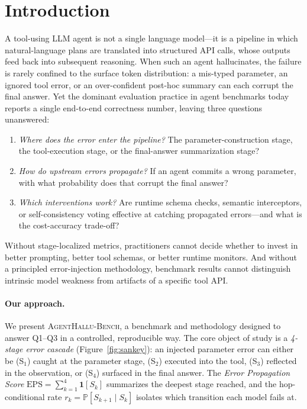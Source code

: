 \documentclass[11pt]{article}
\newcommand{\eps}{\mathrm{EPS}}
\newcommand{\Pr}{\mathbb{P}}
\newcommand{\ind}{\mathbf{1}}
\newcommand{\halluben}{\textsc{AgentHallu-Bench}}
\begin{document}
\section{Introduction}
\label{sec:intro}

A tool-using LLM agent is not a single language model---it is a pipeline in which natural-language plans are translated into structured API calls, whose outputs feed back into subsequent reasoning. When such an agent hallucinates, the failure is rarely confined to the surface token distribution: a mis-typed parameter, an ignored tool error, or an over-confident post-hoc summary can each corrupt the final answer. Yet the dominant evaluation practice in agent benchmarks today \citep{tau-bench, agentbench, toolbench, webarena} reports a single end-to-end correctness number, leaving three questions unanswered:

\begin{enumerate}
  \item[\textbf{Q1}] \emph{Where does the error enter the pipeline?} The parameter-construction stage, the tool-execution stage, or the final-answer summarization stage?
  \item[\textbf{Q2}] \emph{How do upstream errors propagate?} If an agent commits a wrong parameter, with what probability does that corrupt the final answer?
  \item[\textbf{Q3}] \emph{Which interventions work?} Are runtime schema checks, semantic interceptors, or self-consistency voting effective at catching propagated errors---and what is the cost-accuracy trade-off?
\end{enumerate}

Without stage-localized metrics, practitioners cannot decide whether to invest in better prompting, better tool schemas, or better runtime monitors. And without a principled error-injection methodology, benchmark results cannot distinguish intrinsic model weakness from artifacts of a specific tool API.

\paragraph{Our approach.}
We present \halluben{}, a benchmark and methodology designed to answer Q1--Q3 in a controlled, reproducible way. The core object of study is a \emph{4-stage error cascade} (Figure~\ref{fig:sankey}): an injected parameter error can either be (S$_1$) caught at the parameter stage, (S$_2$) executed into the tool, (S$_3$) reflected in the observation, or (S$_4$) surfaced in the final answer. The \emph{Error Propagation Score} $\eps = \sum_{k=1}^{4} \ind[S_k]$ summarizes the deepest stage reached, and the hop-conditional rate $r_k = \Pr[S_{k+1} \mid S_k]$ isolates which transition each model fails at.
\end{document}
